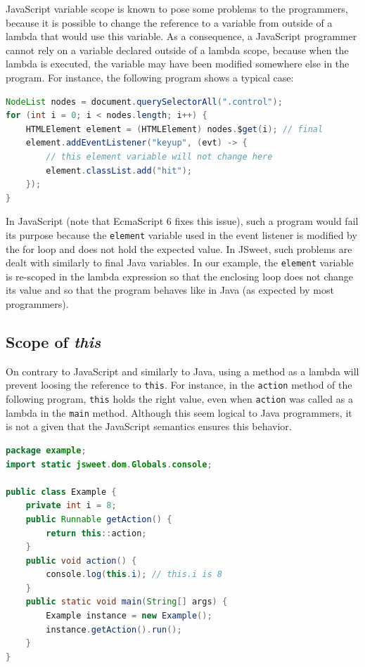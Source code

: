\documentclass[a4paper]{report}
\begin{document}
JavaScript variable scope is known to pose some problems to the programmers, because it is possible to change the reference to a variable from outside of a lambda that would use this variable. As a consequence, a JavaScript programmer cannot rely on a variable declared outside of a lambda scope, because when the lambda is executed, the variable may have been modified somewhere else in the program. For instance, the following program shows a typical case: 

\begin{lstlisting}[language=Java]
NodeList nodes = document.querySelectorAll(".control");
for (int i = 0; i < nodes.length; i++) {
	HTMLElement element = (HTMLElement) nodes.$get(i); // final
	element.addEventListener("keyup", (evt) -> {
	    // this element variable will not change here 
		element.classList.add("hit");
	});
}
\end{lstlisting}

In JavaScript (note that EcmaScript 6 fixes this issue), such a program would fail its purpose because the \texttt{element} variable used in the event listener is modified by the for loop and does not hold the expected value. In JSweet, such problems are dealt with similarly to final Java variables. In our example, the \texttt{element} variable is re-scoped in the lambda expression so that the enclosing loop does not change its value and so that the program behaves like in Java (as expected by most programmers).

\subsection{Scope of \emph{this}}

On contrary to JavaScript and similarly to Java, using a method as a lambda will prevent loosing the reference to \texttt{this}. For instance, in the \texttt{action} method of the following program, \texttt{this} holds the right value, even when \texttt{action} was called as a lambda in the \texttt{main} method. Although this seem logical to Java programmers, it is not a given that the JavaScript semantics ensures this behavior. 

\begin{lstlisting}[language=Java]
package example;
import static jsweet.dom.Globals.console;

public class Example {
	private int i = 8;
	public Runnable getAction() {
		return this::action;
	}
	public void action() {
		console.log(this.i); // this.i is 8
	}
	public static void main(String[] args) {
		Example instance = new Example();
		instance.getAction().run();
	}
}
\end{lstlisting}
\end{document}
